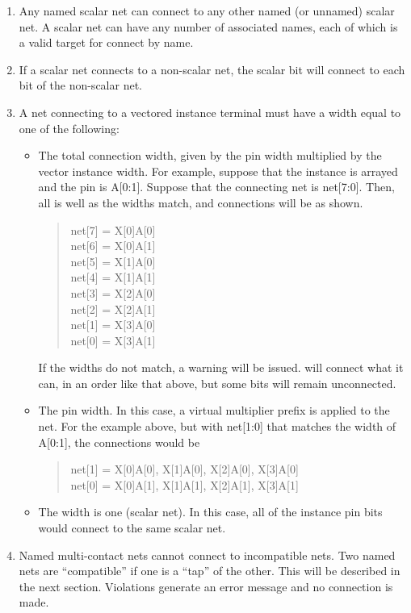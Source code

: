 \begin{enumerate}
\item{Any named scalar net can connect to any other named (or unnamed)
scalar net.  A scalar net can have any number of associated names,
each of which is a valid target for connect by name.}

\item{If a scalar net connects to a non-scalar net, the scalar bit
will connect to each bit of the non-scalar net.}

\item{A net connecting to a vectored instance terminal must have a
width equal to one of the following:

\begin{itemize}
\item{The total connection width, given by the pin width multiplied by
the vector instance width.  For example, suppose that the instance is
arrayed {\vt [0:3]} and the pin is {\vt A[0:1]}.  Suppose that the
connecting net is {\vt net[7:0]}.  Then, all is well as the widths
match, and connections will be as shown.

\begin{quote}
{\vt net[7]} = {\vt X[0]A[0]}\\
{\vt net[6]} = {\vt X[0]A[1]}\\
{\vt net[5]} = {\vt X[1]A[0]}\\
{\vt net[4]} = {\vt X[1]A[1]}\\
{\vt net[3]} = {\vt X[2]A[0]}\\
{\vt net[2]} = {\vt X[2]A[1]}\\
{\vt net[1]} = {\vt X[3]A[0]}\\
{\vt net[0]} = {\vt X[3]A[1]}
\end{quote}

If the widths do not match, a warning will be issued.  {\Xic} will
connect what it can, in an order like that above, but some bits will
remain unconnected.}

\item{The pin width.  In this case, a virtual multiplier prefix is
applied to the net.  For the example above, but with {\vt net[1:0]}
that matches the width of {\vt A[0:1]}, the connections would be

\begin{quote}
{\vt net[1]} = {\vt X[0]A[0]}, {\vt X[1]A[0]}, {\vt X[2]A[0]}, {\vt X[3]A[0]}\\
{\vt net[0]} = {\vt X[0]A[1]}, {\vt X[1]A[1]}, {\vt X[2]A[1]}, {\vt X[3]A[1]}
\end{quote} }

\item{The width is one (scalar net).  In this case, all of the
instance pin bits would connect to the same scalar net.}
\end{itemize} }

\item{Named multi-contact nets cannot connect to incompatible nets. 
Two named nets are ``compatible'' if one is a ``tap'' of the other. 
This will be described in the next section.  Violations generate an
error message and no connection is made.}
\end{enumerate}

